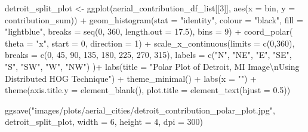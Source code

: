 \documentclass[
  letterpaper,
  DIV=11,
  numbers=noendperiod]{scrreprt}
\newenvironment{Shaded}{\begin{snugshade}}{\end{snugshade}}
\newcommand{\AttributeTok}[1]{\textcolor[rgb]{0.40,0.45,0.13}{#1}}
\newcommand{\DecValTok}[1]{\textcolor[rgb]{0.68,0.00,0.00}{#1}}
\newcommand{\FloatTok}[1]{\textcolor[rgb]{0.68,0.00,0.00}{#1}}
\newcommand{\FunctionTok}[1]{\textcolor[rgb]{0.28,0.35,0.67}{#1}}
\newcommand{\NormalTok}[1]{\textcolor[rgb]{0.00,0.23,0.31}{#1}}
\newcommand{\OtherTok}[1]{\textcolor[rgb]{0.00,0.23,0.31}{#1}}
\newcommand{\SpecialCharTok}[1]{\textcolor[rgb]{0.37,0.37,0.37}{#1}}
\newcommand{\StringTok}[1]{\textcolor[rgb]{0.13,0.47,0.30}{#1}}
\begin{document}
\begin{Shaded}
\begin{Highlighting}[]
\NormalTok{detroit\_split\_plot }\OtherTok{\textless{}{-}}
  \FunctionTok{ggplot}\NormalTok{(aerial\_contribution\_df\_list[[}\DecValTok{3}\NormalTok{]], }
         \FunctionTok{aes}\NormalTok{(}\AttributeTok{x =}\NormalTok{ bin, }\AttributeTok{y =}\NormalTok{ contribution\_sum)) }\SpecialCharTok{+}
  \FunctionTok{geom\_histogram}\NormalTok{(}\AttributeTok{stat =} \StringTok{"identity"}\NormalTok{,}
                 \AttributeTok{colour =} \StringTok{"black"}\NormalTok{, }
                 \AttributeTok{fill =} \StringTok{"lightblue"}\NormalTok{, }
                 \AttributeTok{breaks =} \FunctionTok{seq}\NormalTok{(}\DecValTok{0}\NormalTok{, }\DecValTok{360}\NormalTok{, }\AttributeTok{length.out =} \FloatTok{17.5}\NormalTok{),}
                 \AttributeTok{bins =} \DecValTok{9}\NormalTok{) }\SpecialCharTok{+}
  \FunctionTok{coord\_polar}\NormalTok{(}
    \AttributeTok{theta =} \StringTok{"x"}\NormalTok{, }
    \AttributeTok{start =} \DecValTok{0}\NormalTok{, }
    \AttributeTok{direction =} \DecValTok{1}\NormalTok{) }\SpecialCharTok{+}
  \FunctionTok{scale\_x\_continuous}\NormalTok{(}\AttributeTok{limits =} \FunctionTok{c}\NormalTok{(}\DecValTok{0}\NormalTok{,}\DecValTok{360}\NormalTok{),}
    \AttributeTok{breaks =} \FunctionTok{c}\NormalTok{(}\DecValTok{0}\NormalTok{, }\DecValTok{45}\NormalTok{, }\DecValTok{90}\NormalTok{, }\DecValTok{135}\NormalTok{, }\DecValTok{180}\NormalTok{, }\DecValTok{225}\NormalTok{, }\DecValTok{270}\NormalTok{, }\DecValTok{315}\NormalTok{), }
    \AttributeTok{labels =} \FunctionTok{c}\NormalTok{(}\StringTok{"N"}\NormalTok{, }\StringTok{"NE"}\NormalTok{, }\StringTok{"E"}\NormalTok{, }\StringTok{"SE"}\NormalTok{, }\StringTok{"S"}\NormalTok{, }\StringTok{"SW"}\NormalTok{, }\StringTok{"W"}\NormalTok{, }\StringTok{"NW"}\NormalTok{)}
\NormalTok{  )}\SpecialCharTok{+}
  \FunctionTok{labs}\NormalTok{(}\AttributeTok{title =} \StringTok{"Polar Plot of Detroit, MI Image}\SpecialCharTok{\textbackslash{}n}\StringTok{Using Distributed HOG Technique"}\NormalTok{) }\SpecialCharTok{+}
  \FunctionTok{theme\_minimal}\NormalTok{() }\SpecialCharTok{+}
  \FunctionTok{labs}\NormalTok{(}\AttributeTok{x =} \StringTok{""}\NormalTok{) }\SpecialCharTok{+}
  \FunctionTok{theme}\NormalTok{(}\AttributeTok{axis.title.y =} \FunctionTok{element\_blank}\NormalTok{(),}
        \AttributeTok{plot.title =} \FunctionTok{element\_text}\NormalTok{(}\AttributeTok{hjust =} \FloatTok{0.5}\NormalTok{))}

\FunctionTok{ggsave}\NormalTok{(}\StringTok{"images/plots/aerial\_cities/detroit\_contribution\_polar\_plot.jpg"}\NormalTok{, detroit\_split\_plot, }\AttributeTok{width =} \DecValTok{6}\NormalTok{, }\AttributeTok{height =} \DecValTok{4}\NormalTok{, }\AttributeTok{dpi =} \DecValTok{300}\NormalTok{)}
\end{Highlighting}
\end{Shaded}
\end{document}
